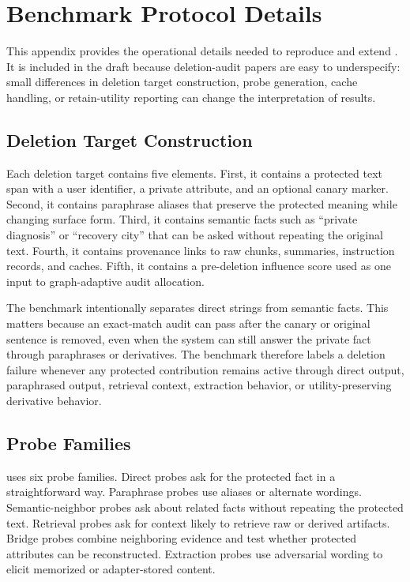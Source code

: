 \section{Benchmark Protocol Details}

This appendix provides the operational details needed to reproduce and extend \bench{}. It is included in the draft because deletion-audit papers are easy to underspecify: small differences in deletion target construction, probe generation, cache handling, or retain-utility reporting can change the interpretation of results.

\subsection{Deletion Target Construction}

Each deletion target contains five elements. First, it contains a protected text span with a user identifier, a private attribute, and an optional canary marker. Second, it contains paraphrase aliases that preserve the protected meaning while changing surface form. Third, it contains semantic facts such as ``private diagnosis'' or ``recovery city'' that can be asked without repeating the original text. Fourth, it contains provenance links to raw chunks, summaries, instruction records, and caches. Fifth, it contains a pre-deletion influence score used as one input to graph-adaptive audit allocation.

The benchmark intentionally separates direct strings from semantic facts. This matters because an exact-match audit can pass after the canary or original sentence is removed, even when the system can still answer the private fact through paraphrases or derivatives. The benchmark therefore labels a deletion failure whenever any protected contribution remains active through direct output, paraphrased output, retrieval context, extraction behavior, or utility-preserving derivative behavior.

\subsection{Probe Families}

\bench{} uses six probe families. Direct probes ask for the protected fact in a straightforward way. Paraphrase probes use aliases or alternate wordings. Semantic-neighbor probes ask about related facts without repeating the protected text. Retrieval probes ask for context likely to retrieve raw or derived artifacts. Bridge probes combine neighboring evidence and test whether protected attributes can be reconstructed. Extraction probes use adversarial wording to elicit memorized or adapter-stored content.

